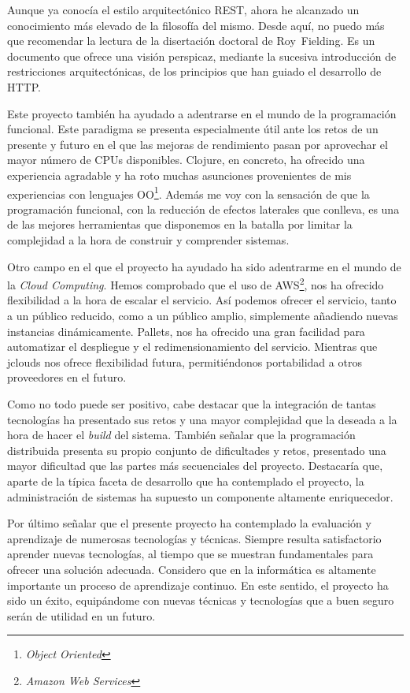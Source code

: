 Aunque ya conocía el estilo arquitectónico REST, ahora he alcanzado un
conocimiento más elevado de la filosofía del mismo. Desde aquí, no
puedo más que recomendar la lectura de la disertación doctoral de
Roy~Fielding\cite{REST}. Es un documento que ofrece una visión
perspicaz, mediante la sucesiva introducción de restricciones
arquitectónicas, de los principios que han guiado el desarrollo de
HTTP.

Este proyecto también ha ayudado a adentrarse en el mundo de la
programación funcional\cite{FUNCTIONAL}. Este paradigma se presenta
especialmente útil ante los retos de un presente y futuro en el que
las mejoras de rendimiento pasan por aprovechar el mayor número de
CPUs disponibles. Clojure, en concreto, ha ofrecido una experiencia
agradable y ha roto muchas asunciones provenientes de mis experiencias
con lenguajes OO\footnote{\emph{Object Oriented}}. Además me voy con
la sensación de que la programación funcional, con la reducción de
efectos laterales que conlleva, es una de las mejores herramientas que
disponemos en la batalla por limitar la complejidad a la hora de
construir y comprender sistemas.

Otro campo en el que el proyecto ha ayudado ha sido adentrarme en el
mundo de la \emph{Cloud Computing}. Hemos comprobado que el uso de
AWS\footnote{\emph{Amazon Web Services}}, nos ha ofrecido flexibilidad
a la hora de escalar el servicio. Así podemos ofrecer el servicio,
tanto a un público reducido, como a un público amplio, simplemente
añadiendo nuevas instancias dinámicamente. Pallets, nos ha ofrecido
una gran facilidad para automatizar el despliegue y el
redimensionamiento del servicio. Mientras que jclouds nos ofrece
flexibilidad futura, permitiéndonos portabilidad a otros proveedores
en el futuro.

Como no todo puede ser positivo, cabe destacar que la integración de
tantas tecnologías ha presentado sus retos y una mayor complejidad que
la deseada a la hora de hacer el \emph{build} del sistema. También
señalar que la programación distribuida presenta su propio conjunto de
dificultades y retos, presentado una mayor dificultad que las partes
más secuenciales del proyecto. Destacaría que, aparte de la típica
faceta de desarrollo que ha contemplado el proyecto, la administración
de sistemas ha supuesto un componente altamente enriquecedor.

Por último señalar que el presente proyecto ha contemplado la
evaluación y aprendizaje de numerosas tecnologías y técnicas. Siempre
resulta satisfactorio aprender nuevas tecnologías, al tiempo que se
muestran fundamentales para ofrecer una solución adecuada. Considero
que en la informática es altamente importante un proceso de
aprendizaje continuo. En este sentido, el proyecto ha sido un éxito,
equipándome con nuevas técnicas y tecnologías que a buen seguro serán
de utilidad en un futuro.

